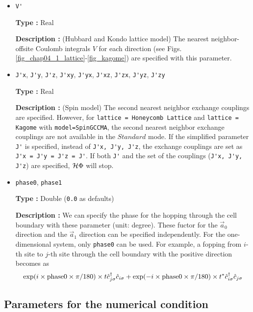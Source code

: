 \begin{itemize}
\item \verb|V'|

{\bf Type :} Real

{\bf Description :} (Hubbard and Kondo lattice model)
The nearest neighbor-offsite Coulomb integrals $V$
 for each direction
(see Figs. \ref{fig_chap04_1_lattice}-\ref{fig_kagome})
are specified with this parameter.

\item \verb|J'x|, \verb|J'y|, \verb|J'z|, \verb|J'xy|, 
  \verb|J'yx|, \verb|J'xz|, \verb|J'zx|, \verb|J'yz|, \verb|J'zy|

{\bf Type :} Real

{\bf Description :} (Spin model)
The second nearest neighbor exchange couplings are specified.
However, for \verb|lattice = Honeycomb Lattice| and  \verb|lattice = Kagome|
with \verb|model=SpinGCCMA|,
the second nearest neighbor exchange couplings are not available in the $Standard$ mode.
If the simplified parameter \verb|J'| is specified, instead of
\verb|J'x, J'y, J'z|,
the exchange couplings are set as
\verb|J'x = J'y = J'z = J'|.
If both \verb|J'| and the set of the couplings (\verb|J'x, J'y, J'z|) are specified,
$\mathcal{H} \Phi$ will stop.

\item \verb|phase0|, \verb|phase1|

  {\bf Type :} Double (\verb|0.0| as defaults)
  
  {\bf Description :}
  We can specify the phase for the hopping through the cell boundary
  with these parameter (unit: degree).
  These fuctor for the $\vec{a}_0$ direction and the $\vec{a}_1$ direction can be specified independently.
  For the one-dimensional system, only \verb|phase0| can be used.
  For example, a fopping from $i$-th site to $j$-th site through the cell boundary with the positive direction
  becomes as 
  \begin{align}
    \exp(i \times {\rm phase0}\times\pi/180) \times t {\hat c}_{j \sigma}^\dagger {\hat c}_{i \sigma}
    + \exp(-i \times {\rm phase0}\times\pi/180) \times t^* {\hat c}_{i \sigma}^\dagger {\hat c}_{j \sigma}
  \end{align}

\end{itemize}

\subsection{Parameters for the numerical condition}

